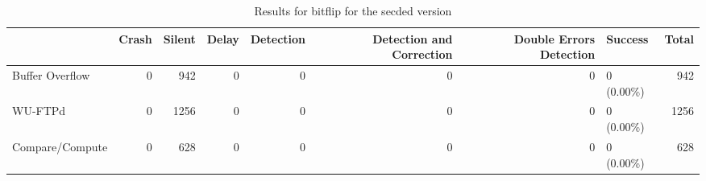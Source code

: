 \begin{table}[t]
\centering
\caption{Results for bitflip for the secded version}
\label{table:end_sim_by_status_secded_1_bitflip}
\begin{tabular}{lrrrrrrlr}
\toprule
 & Crash & Silent & Delay & Detection & Detection and Correction & Double Errors Detection & Success & Total \\
\midrule
Buffer Overflow & 0 & 942 & 0 & 0 & 0 & 0 & 0 (0.00\%) & 942 \\
WU-FTPd & 0 & 1256 & 0 & 0 & 0 & 0 & 0 (0.00\%) & 1256 \\
Compare/Compute & 0 & 628 & 0 & 0 & 0 & 0 & 0 (0.00\%) & 628 \\
\bottomrule
\end{tabular}
\end{table}

